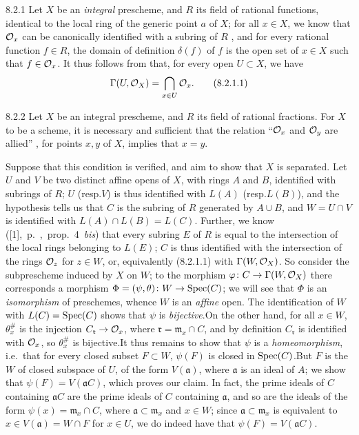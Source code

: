 
\begin{env}{8.2.1}
\label{env-1.8.2.1}
Let $X$ be an \emph{integral} prescheme, and $R$ its field of
rational functions, identical to the local ring of the generic point $a$ of $X$;
for all $x\in X$, we know that $\mathcal{O}_x$ can be canonically identified with a
subring of $R$ , and for every rational function $f\in R$, the
domain of definition $\delta(f)$ of $f$ is the open set of $x\in X$ such that
$f\in\mathcal{O}_x$. It thus follows from  that, for every open $U\subset X$,
we have
\[
  \Gamma(U,\mathcal{O}_X)=\bigcap_{x\in U}\mathcal{O}_x.\tag{8.2.1.1}
\]
\end{env}

\begin{env}[Proposition]{8.2.2}
\label{prop-1.8.2.2}
Let $X$ be an integral prescheme,
and $R$ its field of rational fractions. For $X$ to be a scheme, it is
necessary and sufficient that the relation ``$\mathcal{O}_x$ and $\mathcal{O}_y$ are allied''
, for points $x,y$ of $X$, implies that $x=y$.
\end{env}

Suppose that this condition is verified, and aim to show that $X$ is separated.
Let $U$ and $V$ be two distinct affine opens of $X$, with rings $A$ and $B$,
identified with subrings of $R$; $U$ (resp.$V$) is thus identified 
with $L(A)$ (resp.$L(B)$), and the hypothesis tells us  that $C$ is
the subring of $R$ generated by $A\cup B$, and $W=U\cap V$ is identified with
$L(A)\cap L(B)=L(C)$. Further, we know
([1],~p.~,~prop.~4~\emph{bis}) that every subring $E$ of $R$ is
equal to the intersection of the local rings belonging to $L(E)$; $C$ is thus
identified with the intersection of the rings $\mathcal{O}_z$ for $z\in W$, or,
equivalently (8.2.1.1) with $\Gamma(W,\mathcal{O}_X)$. So consider the subprescheme
induced by $X$ on $W$; to the  morphism $\varphi\colon
C\to\Gamma(W,\mathcal{O}_X)$ there corresponds  a morphism
$\Phi=(\psi,\theta)\colon W\to\operatorname{Spec}(C)$; we will see that $\Phi$ is an
\emph{isomorphism} of preschemes, whence $W$ is an \emph{affine} open. The
identification of $W$ with $L(C)=\operatorname{Spec}(C)$ shows that $\psi$ is
\emph{bijective}.On the other hand, for all $x\in W$, $\theta_x^\#$ is the
injection $C_\mathfrak{r}\to\mathcal{O}_x$, where $\mathfrak{r}=\mathfrak{m}_x\cap C$,
and by definition $C_\mathfrak{r}$ is identified with $\mathcal{O}_x$, so $\theta_x^\#$
is bijective.It thus remains to show that $\psi$ is a \emph{homeomorphism},
i.e.\ that for every closed subset $F\subset W$, $\psi(F)$ is closed in
$\operatorname{Spec}(C)$.But $F$ is the  $W$ of closed subspace of $U$,
of the form $V(\mathfrak{a})$, where $\mathfrak{a}$ is an ideal of $A$; we show
that $\psi(F)=V(\mathfrak{a}C)$, which proves our claim. In fact, the prime
ideals of $C$ containing $\mathfrak{a}C$ are the prime ideals of $C$ containing
$\mathfrak{a}$, and so are the ideals of the form $\psi(x)=\mathfrak{m}_x\cap
C$, where $\mathfrak{a}\subset\mathfrak{m}_x$ and $x\in W$; since
$\mathfrak{a}\subset\mathfrak{m}_x$ is equivalent to $x\in V(\mathfrak{a})=W\cap
F$ for $x\in U$, we do indeed have that $\psi(F)=V(\mathfrak{a}C)$.

